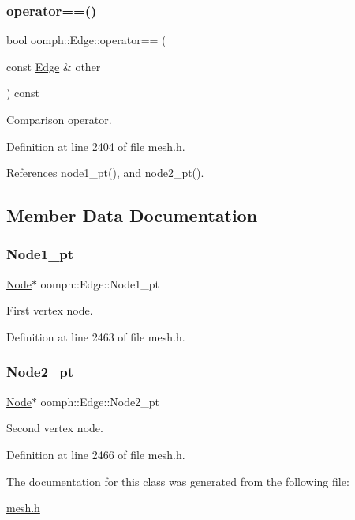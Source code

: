 \subsubsection{\texorpdfstring{operator==()}{operator==()}}
{\footnotesize\ttfamily bool oomph\+::\+Edge\+::operator== (\begin{DoxyParamCaption}\item[{const \hyperlink{classoomph_1_1Edge}{Edge} \&}]{other }\end{DoxyParamCaption}) const\hspace{0.3cm}{\ttfamily [inline]}}



Comparison operator. 



Definition at line 2404 of file mesh.\+h.



References node1\+\_\+pt(), and node2\+\_\+pt().



\subsection{Member Data Documentation}
\mbox{\label{classoomph_1_1Edge_abeda3f3e0e770102690fe836c1a5ee70}} 
\subsubsection{\texorpdfstring{Node1\+\_\+pt}{Node1\_pt}}
{\footnotesize\ttfamily \hyperlink{classoomph_1_1Node}{Node}$\ast$ oomph\+::\+Edge\+::\+Node1\+\_\+pt\hspace{0.3cm}{\ttfamily [private]}}



First vertex node. 



Definition at line 2463 of file mesh.\+h.

\mbox{\label{classoomph_1_1Edge_ad5c83aa8a63acf45173e5f255477a9b9}} 
\subsubsection{\texorpdfstring{Node2\+\_\+pt}{Node2\_pt}}
{\footnotesize\ttfamily \hyperlink{classoomph_1_1Node}{Node}$\ast$ oomph\+::\+Edge\+::\+Node2\+\_\+pt\hspace{0.3cm}{\ttfamily [private]}}



Second vertex node. 



Definition at line 2466 of file mesh.\+h.



The documentation for this class was generated from the following file\+:\begin{DoxyCompactItemize}
\item 
\hyperlink{mesh_8h}{mesh.\+h}\end{DoxyCompactItemize}
